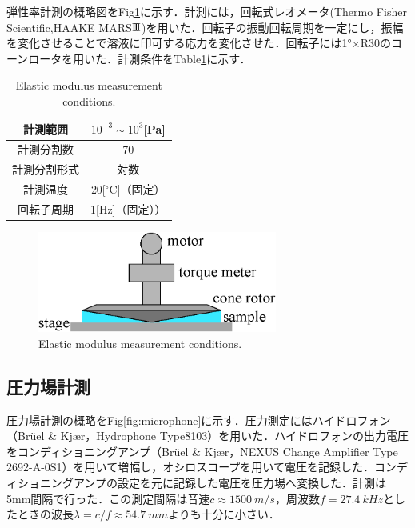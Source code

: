 弾性率計測の概略図をFig\ref{fig:elastic-measure}に示す．計測には，回転式レオメータ(Thermo Fisher Scientific,HAAKE MARS$\rm I\hspace{-.15em}I\hspace{-.15em}I$)を用いた．回転子の振動回転周期を一定にし，振幅を変化させることで溶液に印可する応力を変化させた．回転子には1°×R30のコーンロータを用いた．計測条件をTable\ref{table:elastic}に示す．

\begin{table}[ht]
    \centering
    \caption{Elastic modulus measurement conditions.}
    \label{table:elastic}
    \begin{tabular}{c|c}\hline
        計測範囲     & $10^{-3} \sim 10^3$[Pa] \\ \hline
        計測分割数   & 70                      \\ \hline
        計測分割形式 & 対数                    \\ \hline
        計測温度     & 20[$^\circ$C]（固定）   \\ \hline
        回転子周期   & 1[Hz]（固定））         \\ \hline
    \end{tabular}
\end{table}

\begin{figure}[ht]
    \centering
    \includegraphics[width=0.7\textwidth]{2-Methods/rheometer.eps}
    \caption{Elastic modulus measurement conditions.}
    \label{fig:elastic-measure}
\end{figure}

\newpage

\subsection{圧力場計測}

圧力場計測の概略をFig\ref{fig:microphone}に示す．圧力測定にはハイドロフォン（Br\"{u}el \& Kj\ae r，Hydrophone Type8103）を用いた．ハイドロフォンの出力電圧をコンディショニングアンプ（Br\"{u}el \& Kj\ae r，NEXUS Change Amplifier Type 2692-A-0S1）を用いて増幅し，オシロスコープを用いて電圧を記録した．コンディショニングアンプの設定を元に記録した電圧を圧力場へ変換した．計測は5mm間隔で行った．この測定間隔は音速$c\approx \SI{1500}{m/s}$，周波数$f=\SI{27.4}{kHz}$としたときの波長$\lambda=c/f\approx \SI{54.7}{mm}$よりも十分に小さい．

